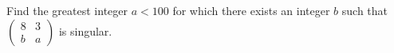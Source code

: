 Find the greatest integer $a<100$ for which there exists an integer $b$ such that $\begin{pmatrix}8&3\\b&a\end{pmatrix}$ is singular.
